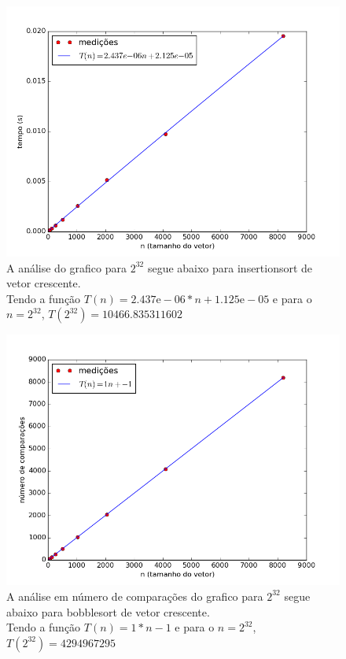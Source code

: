 \documentclass[12pt,a4paper,twoside]{report}
\begin{document}


\begin{figure}[ht]
\centering \includegraphics[scale=0.8]{../insertionsort/imagens/insertionsortCrescente0.png}
\caption{A análise do grafico para $2^{32}$ segue abaixo para insertionsort de vetor crescente.\\
Tendo a função $T(n) = 2.437\mathrm{e}-06*n+1.125\mathrm{e}-05$ e para o $n =2^{32}$, $T(2^{32}) = 10466.835311602$}
\label{fig:insertionsortCrescente0}
\end{figure}

\begin{figure}[ht]
\centering \includegraphics[scale=0.8]{../insertionsort/imagens/insertionsortCrescente1.png}
\caption{A análise em número de comparações do grafico para $2^{32}$ segue abaixo para bobblesort de vetor crescente.\\
Tendo a função $T(n) = 1*n - 1$ e para o $n =2^{32}$, $T(2^{32}) = 4294967295$}
\label{fig:insertionsortCrescente1}
\end{figure}
\end{document}
